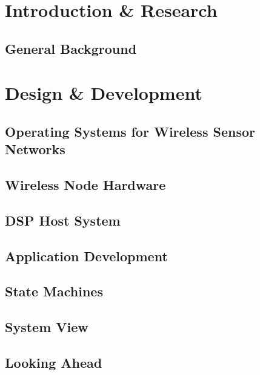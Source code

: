 \part{Introduction \& Research}
\chapter{General Background}





\part{Design \& Development} 
\chapter{Operating Systems for Wireless Sensor Networks}



\chapter{Wireless Node Hardware}



\chapter{DSP Host System}



\chapter{Application Development}



\chapter{State Machines}



\chapter{System View}


\chapter{Looking Ahead}

